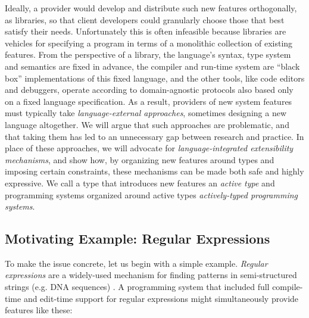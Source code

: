 Ideally, a provider would develop and distribute such new features orthogonally, as libraries, so that client developers could granularly choose those that best satisfy their needs. Unfortunately this is often infeasible because libraries are vehicles for specifying a program in terms of a monolithic collection of existing features. From the perspective of a library, the language's syntax, type system and semantics are fixed in advance, the compiler and run-time system are ``black box'' implementations of this fixed language, and the other tools, like code editors and debuggers, operate according to domain-agnostic protocols also based only on a fixed language specification. As a result, providers of new system features must typically take \emph{language-external approaches}, sometimes designing a new language altogether. We will argue that such approaches are problematic, and that taking them has led to an unnecessary gap between research and practice. In place of these approaches, we will advocate for \emph{language-integrated extensibility mechanisms}, and show how, by organizing new features around {types} and imposing certain constraints, these mechanisms can be made both safe and highly expressive. We call a type that introduces new features an \emph{active type} and programming systems organized around active types \emph{actively-typed programming systems}.

\subsection{Motivating Example: Regular Expressions}\label{regex}
To make the issue concrete, let us begin with a simple example. \emph{Regular expressions} are a widely-used mechanism for finding patterns in semi-structured strings (e.g. DNA sequences) \cite{Thompson:1968:PTR:363347.363387}. A programming system that included full compile-time and edit-time support for regular expressions might simultaneously provide features like these:

